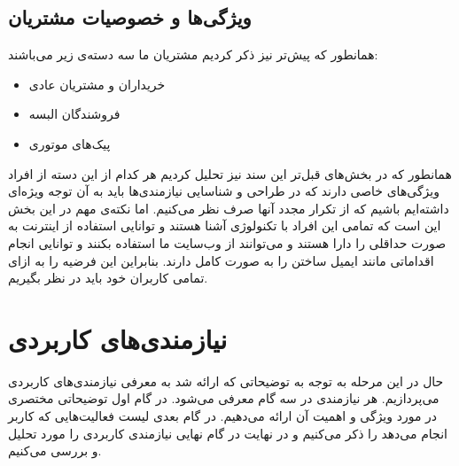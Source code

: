 \documentclass[]{article}
\begin{document}
\subsection{ویژگی‌ها و خصوصیات
مشتریان}\label{ux648ux6ccux698ux6afux6ccux647ux627-ux648-ux62eux635ux648ux635ux6ccux627ux62a-ux645ux634ux62aux631ux6ccux627ux646}

همانطور که پیش‌تر نیز ذکر کردیم مشتریان ما سه دسته‌ی زیر می‌باشند:

\begin{itemize}
\item
  خریداران و مشتریان عادی
\item
  فروشندگان البسه
\item
  پیک‌های موتوری
\end{itemize}

همانطور که در بخش‌های قبل‌تر این سند نیز تحلیل کردیم هر کدام از این دسته
از افراد ویژگی‌های خاصی دارند که در طراحی و شناسایی نیازمندی‌ها باید به
آن توجه ویژه‌ای داشته‌ایم باشیم که از تکرار مجدد آنها صرف نظر می‌کنیم.
اما نکته‌ی مهم در این بخش این است که تمامی این افراد با تکنولوژی آشنا
هستند و توانایی استفاده از اینترنت به صورت‌ حداقلی را دارا هستند و
می‌توانند از وب‌سایت ما استفاده بکنند و توانایی انجام اقداماتی مانند
ایمیل ساختن را به صورت کامل دارند. بنابراین این فرضیه را به ازای تمامی
کاربران خود باید در نظر بگیریم.

\section{نیازمندی‌های
کاربردی}\label{ux646ux6ccux627ux632ux645ux646ux62fux6ccux647ux627ux6cc-ux6a9ux627ux631ux628ux631ux62fux6cc}

حال در این مرحله به توجه به توضیحاتی که ارائه شد به معرفی نیازمندی‌های
کاربردی می‌پردازیم. هر نیازمندی در سه گام معرفی می‌شود. در گام اول
توضیحاتی مختصری در مورد ویژگی و اهمیت آن ارائه می‌دهیم. در گام بعدی لیست
فعالیت‌هایی که کاربر انجام می‌دهد را ذکر می‌کنیم و در نهایت در گام نهایی
نیازمندی کاربردی را مورد تحلیل و بررسی می‌کنیم.
\end{document}
